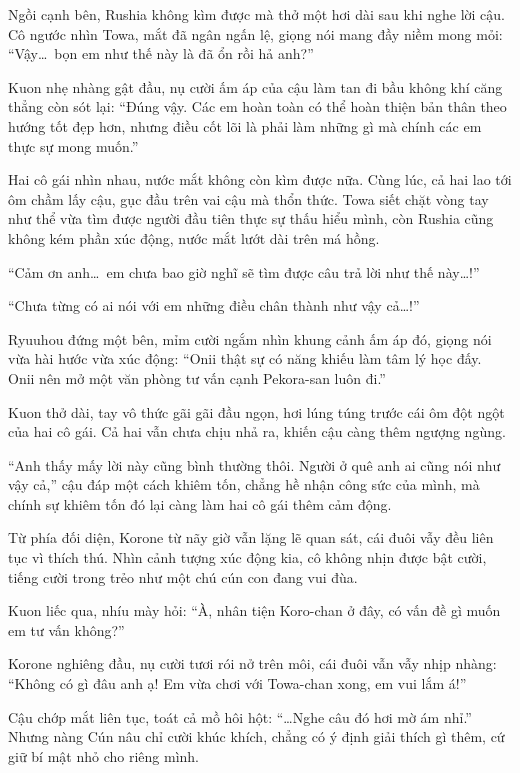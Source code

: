 \documentclass[../main.tex]{subfiles}
\begin{document}
Ngồi cạnh bên, Rushia không kìm được mà thở một hơi dài sau khi nghe lời cậu. Cô ngước nhìn Towa, mắt đã ngân ngấn lệ, giọng nói mang đầy niềm mong mỏi: ``Vậy\dots\ bọn em như thế này là đã ổn rồi hả anh?''

Kuon nhẹ nhàng gật đầu, nụ cười ấm áp của cậu làm tan đi bầu không khí căng thẳng còn sót lại: ``Đúng vậy. Các em hoàn toàn có thể hoàn thiện bản thân theo hướng tốt đẹp hơn, nhưng điều cốt lõi là phải làm những gì mà chính các em thực sự mong muốn.''

Hai cô gái nhìn nhau, nước mắt không còn kìm được nữa. Cùng lúc, cả hai lao tới ôm chầm lấy cậu, gục đầu trên vai cậu mà thổn thức. Towa siết chặt vòng tay như thể vừa tìm được người đầu tiên thực sự thấu hiểu mình, còn Rushia cũng không kém phần xúc động, nước mắt lướt dài trên má hồng.

``Cảm ơn anh\dots\ em chưa bao giờ nghĩ sẽ tìm được câu trả lời như thế này\dots!''

``Chưa từng có ai nói với em những điều chân thành như vậy cả\dots!''

Ryuuhou đứng một bên, mỉm cười ngắm nhìn khung cảnh ấm áp đó, giọng nói vừa hài hước vừa xúc động: ``Onii thật sự có năng khiếu làm tâm lý học đấy. Onii nên mở một văn phòng tư vấn cạnh Pekora-san luôn đi.''

Kuon thở dài, tay vô thức gãi gãi đầu ngọn, hơi lúng túng trước cái ôm đột ngột của hai cô gái. Cả hai vẫn chưa chịu nhả ra, khiến cậu càng thêm ngượng ngùng.

``Anh thấy mấy lời này cũng bình thường thôi. Người ở quê anh ai cũng nói như vậy cả,'' cậu đáp một cách khiêm tốn, chẳng hề nhận công sức của mình, mà chính sự khiêm tốn đó lại càng làm hai cô gái thêm cảm động.

Từ phía đối diện, Korone từ nãy giờ vẫn lặng lẽ quan sát, cái đuôi vẫy đều liên tục vì thích thú. Nhìn cảnh tượng xúc động kia, cô không nhịn được bật cười, tiếng cười trong trẻo như một chú cún con đang vui đùa.

Kuon liếc qua, nhíu mày hỏi: ``À, nhân tiện Koro-chan ở đây, có vấn đề gì muốn em tư vấn không?''

Korone nghiêng đầu, nụ cười tươi rói nở trên môi, cái đuôi vẫn vẫy nhịp nhàng: ``Không có gì đâu anh ạ! Em vừa chơi với Towa-chan xong, em vui lắm á!''

Cậu chớp mắt liên tục, toát cả mồ hôi hột: ``\dots Nghe câu đó hơi mờ ám nhỉ.'' Nhưng nàng Cún nâu chỉ cười khúc khích, chẳng có ý định giải thích gì thêm, cứ giữ bí mật nhỏ cho riêng mình.
\end{document}
